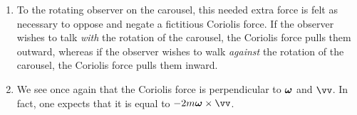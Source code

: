 \begin{enumerate}
  \item To the rotating observer on the carousel, this needed extra
  force is felt as necessary to oppose and negate a fictitious Coriolis
  force. If the observer wishes to talk \emph{with} the rotation of the
  carousel, the Coriolis force pulls them outward, whereas if the
  observer wishes to walk \emph{against} the rotation of the carousel,
  the Coriolis force pulls them inward.

  \item We see once again that the Coriolis force is perpendicular to
  $\bm{\mathrm{\omega}}$ and $\vv$. In fact, one expects that it is equal to $-2
  m\vomega \cross \vv$.
\end{enumerate}
